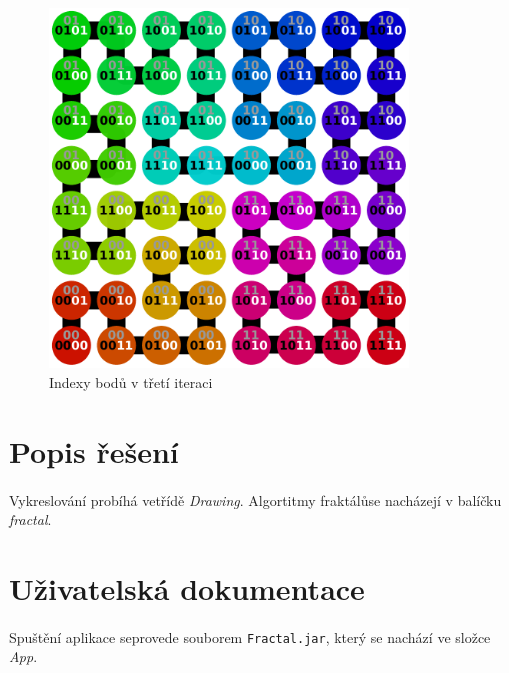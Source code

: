 \documentclass[12pt]{scrartcl}
\begin{document}
\begin{figure}[!ht]
	\centering
	\label{obr:polekolizi}
	\includegraphics[width=0.85\textwidth,natwidth=1,natheight=1]{hilbert.pdf}
	\caption{Indexy bodů v třetí iteraci}
\end{figure}

\section{Popis řešení}

\paragraph{}
Vykreslování probíhá ve\nobreakspace třídě \emph{Drawing}. Algortitmy fraktálů\nobreakspace  se nacházejí v balíčku \emph{fractal}.

\newpage
\section{Uživatelská dokumentace}

\paragraph{}
Spuštění aplikace se\nobreakspace provede souborem \texttt{Fractal.jar}, který se nachází ve složce \emph{App}.
\end{document}
